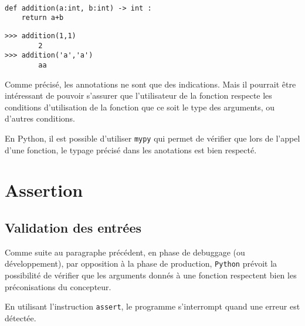 \begin{exemple}~\\
\begin{minipage}[c]{.45\linewidth}
\begin{lstlisting}
def addition(a:int, b:int) -> int : 
    return a+b
\end{lstlisting}
\end{minipage} \hfill
\begin{minipage}[c]{.45\linewidth}
\begin{lstlisting}
>>> addition(1,1)
        2
>>> addition('a','a')
        aa
\end{lstlisting}
\end{minipage} 

\end{exemple}

Comme précisé, les annotations ne sont que des indications. Mais il pourrait être intéressant de pouvoir s'assurer que l'utilisateur de la fonction respecte les conditions d'utilisation de la fonction que ce soit le type des arguments, ou d'autres conditions.

\begin{rem}
En Python, il est possible d'utiliser \texttt{mypy} qui permet de vérifier que lors de l'appel d'une fonction, le typage précisé dans les anotations est bien respecté. 
\end{rem}



\section{Assertion}
\subsection{Validation des entrées}
Comme suite au paragraphe précédent, en phase de debuggage (ou développement), par opposition à la phase de production, \texttt{Python} prévoit la possibilité de vérifier que les arguments donnés à une fonction respectent bien les préconisations du concepteur. 

En utilisant l’instruction \texttt{assert}, le programme s'interrompt quand une erreur est détectée. 

